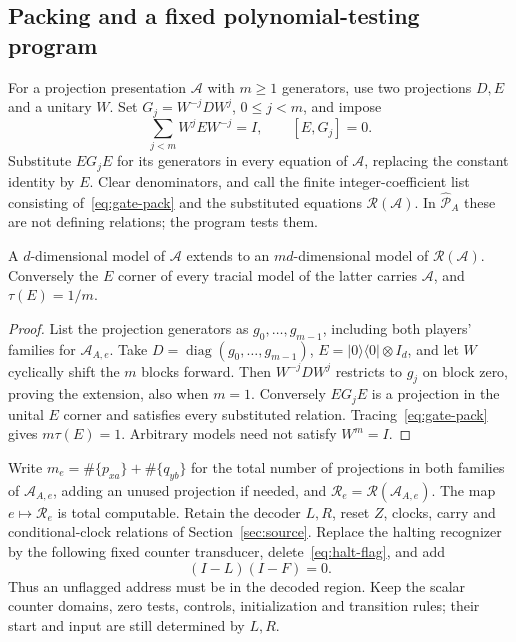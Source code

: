 \subsection{Packing and a fixed polynomial-testing program}
For a projection presentation $\mathcal A$ with $m\ge1$ generators, use two projections $D,E$ and a unitary $W$. Set $G_j=W^{-j}DW^j$, $0\le j<m$, and impose
\begin{equation}\label{eq:gate-pack}
 \sum_{j<m}W^jEW^{-j}=I,\qquad [E,G_j]=0.
\end{equation}
Substitute $EG_jE$ for its generators in every equation of $\mathcal A$, replacing the constant identity by $E$. Clear denominators, and call the finite integer-coefficient list consisting of~\eqref{eq:gate-pack} and the substituted equations $\mathcal R(\mathcal A)$. In $\widehat{\mathcal P}_A$ these are not defining relations; the program tests them.

\begin{lemma}\label{lem:gate-packing}
A $d$-dimensional model of $\mathcal A$ extends to an $md$-dimensional model of $\mathcal R(\mathcal A)$. Conversely the $E$ corner of every tracial model of the latter carries $\mathcal A$, and $\tau(E)=1/m$.
\end{lemma}
\begin{proof}
List the projection generators as $g_0,\ldots,g_{m-1}$, including both players' families for $\mathcal A_{A,e}$. Take $D=\operatorname{diag}(g_0,\ldots,g_{m-1})$, $E=|0\rangle\langle0|\otimes I_d$, and let $W$ cyclically shift the $m$ blocks forward. Then $W^{-j}DW^j$ restricts to $g_j$ on block zero, proving the extension, also when $m=1$. Conversely $EG_jE$ is a projection in the unital $E$ corner and satisfies every substituted relation. Tracing~\eqref{eq:gate-pack} gives $m\tau(E)=1$. Arbitrary models need not satisfy $W^m=I$.
\end{proof}

Write $m_e=\#\{p_{xa}\}+\#\{q_{yb}\}$ for the total number of projections in both families of $\mathcal A_{A,e}$, adding an unused projection if needed, and $\mathcal R_e=\mathcal R(\mathcal A_{A,e})$. The map $e\mapsto\mathcal R_e$ is total computable. Retain the decoder $L,R$, reset $Z$, clocks, carry and conditional-clock relations of Section~\ref{sec:source}. Replace the halting recognizer by the following fixed counter transducer, delete~\eqref{eq:halt-flag}, and add
\begin{equation}\label{eq:gate-region}
 (I-L)(I-F)=0.
\end{equation}
Thus an unflagged address must be in the decoded region. Keep the scalar counter domains, zero tests, controls, initialization and transition rules; their start and input are still determined by $L,R$.


